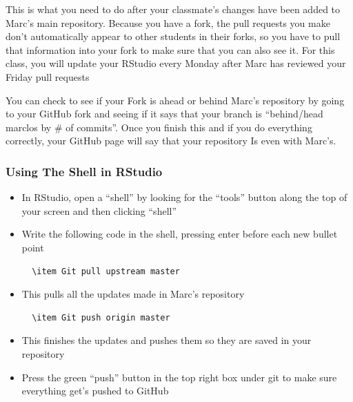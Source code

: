 \documentclass[12pt]{../SOP4_alpha}\usepackage[]{graphicx}\usepackage[]{color}
\begin{document}
This is what you need to do after your classmate’s changes have been added to Marc's main repository. Because you have a fork, the pull requests you make don’t automatically appear to other students in their forks, so you have to pull that information into your fork to make sure that you can also see it. For this class, you will update your RStudio every Monday after Marc has reviewed your Friday pull requests

You can check to see if your Fork is ahead or behind Marc’s repository by going to your GitHub fork and seeing if it says that your branch is ``behind/head marclos by \# of commits''. Once you finish this and if you do everything correctly, your GitHub page will say that your repository Is even with Marc's. 

\subsubsection{Using The Shell in RStudio}
\begin{itemize}
\item In RStudio, open a ``shell'' by looking for the ``tools'' button along the top of your screen and then clicking “shell”
\item Write the following code in the shell, pressing enter before each new bullet point 
  \begin{verbatim}
  \item Git pull upstream master
  \end{verbatim}
    \item This pulls all the updates made in Marc’s repository
  \begin{verbatim}
  \item Git push origin master 
  \end{verbatim}
    \item This finishes the updates and pushes them so they are saved in your repository
\item Press the green “push” button in the top right box under git to make sure everything get’s pushed to GitHub
\end{itemize}
\end{document}
